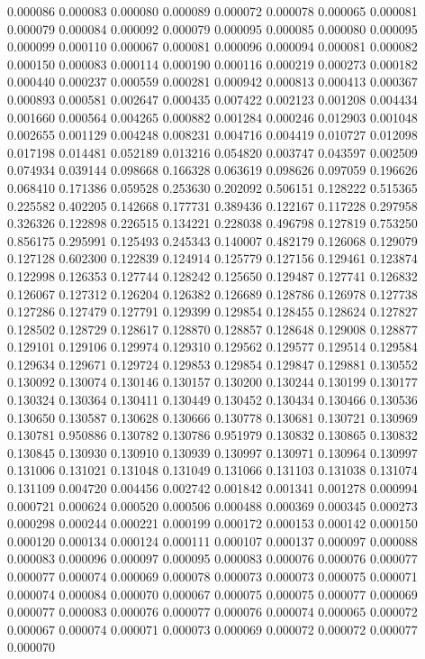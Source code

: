 0.000086
0.000083
0.000080
0.000089
0.000072
0.000078
0.000065
0.000081
0.000079
0.000084
0.000092
0.000079
0.000095
0.000085
0.000080
0.000095
0.000099
0.000110
0.000067
0.000081
0.000096
0.000094
0.000081
0.000082
0.000150
0.000083
0.000114
0.000190
0.000116
0.000219
0.000273
0.000182
0.000440
0.000237
0.000559
0.000281
0.000942
0.000813
0.000413
0.000367
0.000893
0.000581
0.002647
0.000435
0.007422
0.002123
0.001208
0.004434
0.001660
0.000564
0.004265
0.000882
0.001284
0.000246
0.012903
0.001048
0.002655
0.001129
0.004248
0.008231
0.004716
0.004419
0.010727
0.012098
0.017198
0.014481
0.052189
0.013216
0.054820
0.003747
0.043597
0.002509
0.074934
0.039144
0.098668
0.166328
0.063619
0.098626
0.097059
0.196626
0.068410
0.171386
0.059528
0.253630
0.202092
0.506151
0.128222
0.515365
0.225582
0.402205
0.142668
0.177731
0.389436
0.122167
0.117228
0.297958
0.326326
0.122898
0.226515
0.134221
0.228038
0.496798
0.127819
0.753250
0.856175
0.295991
0.125493
0.245343
0.140007
0.482179
0.126068
0.129079
0.127128
0.602300
0.122839
0.124914
0.125779
0.127156
0.129461
0.123874
0.122998
0.126353
0.127744
0.128242
0.125650
0.129487
0.127741
0.126832
0.126067
0.127312
0.126204
0.126382
0.126689
0.128786
0.126978
0.127738
0.127286
0.127479
0.127791
0.129399
0.129854
0.128455
0.128624
0.127827
0.128502
0.128729
0.128617
0.128870
0.128857
0.128648
0.129008
0.128877
0.129101
0.129106
0.129974
0.129310
0.129562
0.129577
0.129514
0.129584
0.129634
0.129671
0.129724
0.129853
0.129854
0.129847
0.129881
0.130552
0.130092
0.130074
0.130146
0.130157
0.130200
0.130244
0.130199
0.130177
0.130324
0.130364
0.130411
0.130449
0.130452
0.130434
0.130466
0.130536
0.130650
0.130587
0.130628
0.130666
0.130778
0.130681
0.130721
0.130969
0.130781
0.950886
0.130782
0.130786
0.951979
0.130832
0.130865
0.130832
0.130845
0.130930
0.130910
0.130939
0.130997
0.130971
0.130964
0.130997
0.131006
0.131021
0.131048
0.131049
0.131066
0.131103
0.131038
0.131074
0.131109
0.004720
0.004456
0.002742
0.001842
0.001341
0.001278
0.000994
0.000721
0.000624
0.000520
0.000506
0.000488
0.000369
0.000345
0.000273
0.000298
0.000244
0.000221
0.000199
0.000172
0.000153
0.000142
0.000150
0.000120
0.000134
0.000124
0.000111
0.000107
0.000137
0.000097
0.000088
0.000083
0.000096
0.000097
0.000095
0.000083
0.000076
0.000076
0.000077
0.000077
0.000074
0.000069
0.000078
0.000073
0.000073
0.000075
0.000071
0.000074
0.000084
0.000070
0.000067
0.000075
0.000075
0.000077
0.000069
0.000077
0.000083
0.000076
0.000077
0.000076
0.000074
0.000065
0.000072
0.000067
0.000074
0.000071
0.000073
0.000069
0.000072
0.000072
0.000077
0.000070
